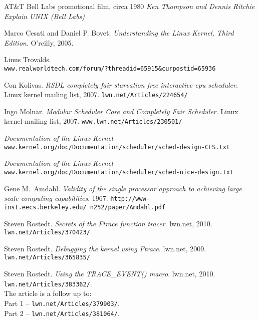 \documentclass[10pt, oneside]{book}
\begin{document}
\begin{thebibliography}{}
AT\&T Bell Labs promotional film, circa 1980
\textit{Ken Thompson and Dennis Ritchie Explain UNIX (Bell Labs)} %

Marco Cesati and Daniel P. Bovet.
\textit{Understanding the Linux Kernel, Third Edition}.
O'reilly, 2005.

Linus Trovalds.\\
\texttt{www.realworldtech.com/forum/?threadid=65915\&curpostid=65936}

Con Kolivas.
\textit{RSDL completely fair starvation free interactive cpu scheduler}.
Linux kernel mailing list, 2007. 
\texttt{lwn.net/Articles/224654/}

Ingo Molnar.
\textit{Modular Scheduler Core and Completely Fair Scheduler}.
Linux kernel mailing list, 2007. 
\texttt{www.lwn.net/Articles/230501/}

\textit{Documentation of the Linux Kernel}\\
\texttt{www.kernel.org/doc/Documentation/scheduler/sched-design-CFS.txt}

\textit{Documentation of the Linux Kernel}\\
\texttt{www.kernel.org/doc/Documentation/scheduler/sched-nice-design.txt}

Gene M.\ Amdahl.
\textit{Validity of the single processor approach to achieving large scale
computing capabilities}.
1967.
\texttt{http://www-inst.eecs.berkeley.edu/~n252/paper/Amdahl.pdf}

Steven Rostedt.
\textit{Secrets of the Ftrace function tracer}.
lwn.net, 2010.
\texttt{lwn.net/Articles/370423/}

Steven Rostedt.
\textit{Debugging the kernel using Ftrace}.
lwn.net, 2009.
\texttt{lwn.net/Articles/365835/}

Steven Rostedt.
\textit{Using the TRACE\_EVENT() macro}.
lwn.net, 2010.
\texttt{lwn.net/Articles/383362/}.\\
The article is a follow up to:\\
Part 1 -- \texttt{lwn.net/Articles/379903/}.\\
Part 2 -- \texttt{lwn.net/Articles/381064/}.
\end{thebibliography}
\end{document}
